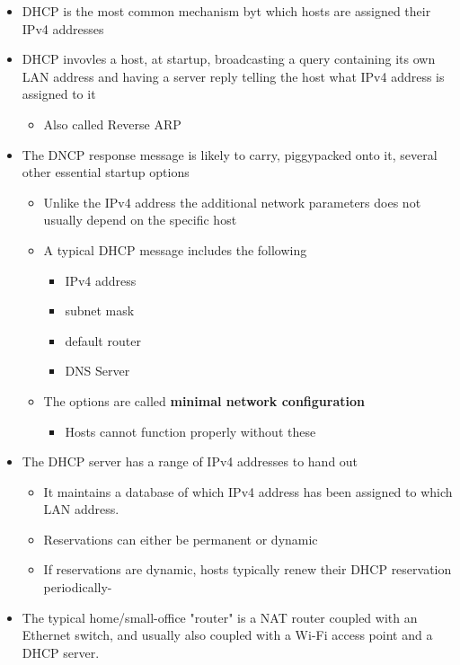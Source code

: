 \documentclass[11pt]{article}
\providecommand{\tightlist}{%
      \setlength{\itemsep}{0pt}\setlength{\parskip}{0pt}}
\begin{document}
\begin{itemize}
\tightlist
\item
  DHCP is the most common mechanism byt which hosts are assigned their
  IPv4 addresses
\item
  DHCP invovles a host, at startup, broadcasting a query containing its
  own LAN address and having a server reply telling the host what IPv4
  address is assigned to it

  \begin{itemize}
  \tightlist
  \item
    Also called Reverse ARP
  \end{itemize}
\item
  The DNCP response message is likely to carry, piggypacked onto it,
  several other essential startup options

  \begin{itemize}
  \tightlist
  \item
    Unlike the IPv4 address the additional network parameters does not
    usually depend on the specific host
  \item
    A typical DHCP message includes the following

    \begin{itemize}
    \tightlist
    \item
      IPv4 address
    \item
      subnet mask
    \item
      default router
    \item
      DNS Server
    \end{itemize}
  \item
    The options are called \textbf{minimal network configuration}

    \begin{itemize}
    \tightlist
    \item
      Hosts cannot function properly without these
    \end{itemize}
  \end{itemize}
\item
  The DHCP server has a range of IPv4 addresses to hand out

  \begin{itemize}
  \tightlist
  \item
    It maintains a database of which IPv4 address has been assigned to
    which LAN address.
  \item
    Reservations can either be permanent or dynamic
  \item
    If reservations are dynamic, hosts typically renew their DHCP
    reservation periodically-
  \end{itemize}
\item
  The typical home/small-office "router" is a NAT router coupled with an
  Ethernet switch, and usually also coupled with a Wi-Fi access point
  and a DHCP server.
\end{itemize}
\end{document}
